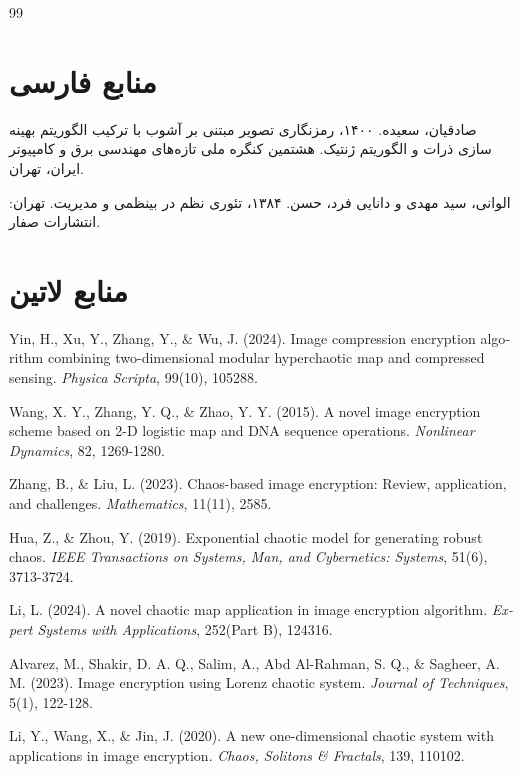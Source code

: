 \documentclass[a4paper,12pt]{report}
\renewcommand{\%}{\lr{\oldpercent}}
\begin{document}
\begin{thebibliography}{99}

\section*{منابع فارسی}

 صادقیان، سعیده. ۱۴۰۰، رمزنگاری تصویر مبتنی بر آشوب با ترکیب الگوریتم بهینه سازی ذرات و الگوریتم ژنتیک. هشتمین کنگره ملی تازه‌های مهندسی برق و کامپیوتر ایران، تهران.

 الوانی، سید مهدی و دانایی فرد، حسن. ۱۳۸۴، تئوری نظم در بینظمی و مدیریت. تهران: انتشارات صفار.

\section*{منابع لاتین}

\begin{LTRbibitems}
\begin{latin}
 Yin, H., Xu, Y., Zhang, Y., \& Wu, J. (2024). Image compression encryption algorithm combining two-dimensional modular hyperchaotic map and compressed sensing. \textit{Physica Scripta}, 99(10), 105288.

 Wang, X. Y., Zhang, Y. Q., \& Zhao, Y. Y. (2015). A novel image encryption scheme based on 2-D logistic map and DNA sequence operations. \textit{Nonlinear Dynamics}, 82, 1269-1280.

 Zhang, B., \& Liu, L. (2023). Chaos-based image encryption: Review, application, and challenges. \textit{Mathematics}, 11(11), 2585.

 Hua, Z., \& Zhou, Y. (2019). Exponential chaotic model for generating robust chaos. \textit{IEEE Transactions on Systems, Man, and Cybernetics: Systems}, 51(6), 3713-3724.

 Li, L. (2024). A novel chaotic map application in image encryption algorithm. \textit{Expert Systems with Applications}, 252(Part B), 124316.

 Alvarez, M., Shakir, D. A. Q., Salim, A., Abd Al-Rahman, S. Q., \& Sagheer, A. M. (2023). Image encryption using Lorenz chaotic system. \textit{Journal of Techniques}, 5(1), 122-128.

 Li, Y., Wang, X., \& Jin, J. (2020). A new one-dimensional chaotic system with applications in image encryption. \textit{Chaos, Solitons \& Fractals}, 139, 110102.


\end{latin}
\end{LTRbibitems}
\end{thebibliography}
\end{document}
